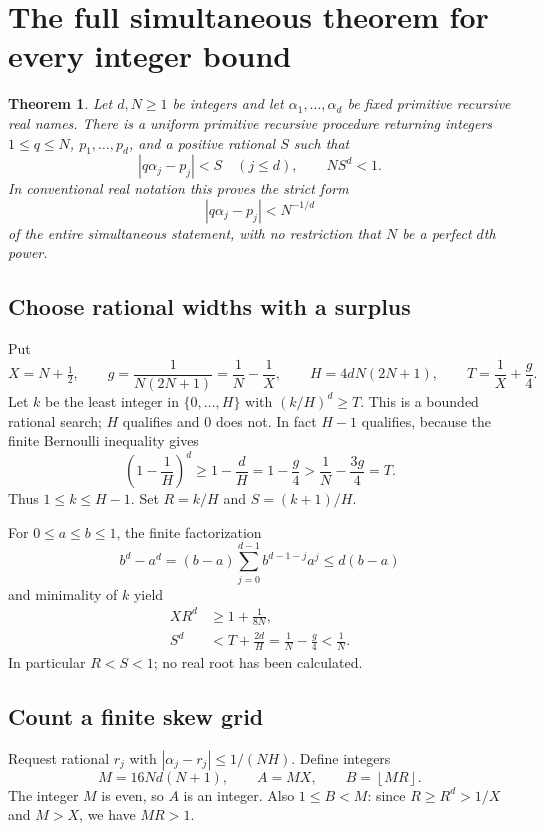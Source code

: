 \documentclass[11pt]{article}
\newtheorem{theorem}{Theorem}[section]
\theoremstyle{definition}\newtheorem{definition}[theorem]{Definition}
\theoremstyle{remark}\newtheorem{remark}[theorem]{Remark}
\newcommand{\floor}[1]{\left\lfloor#1\right\rfloor}
\begin{document}
\section{The full simultaneous theorem for every integer bound}\label{sec:simultaneous}

\begin{theorem}\label{thm:simultaneous}
Let $d,N\ge1$ be integers and let $\alpha_1,\ldots,\alpha_d$ be fixed primitive recursive real names. There is a uniform primitive recursive procedure returning integers $1\le q\le N$, $p_1,\ldots,p_d$, and a positive rational $S$ such that
\[
 |q\alpha_j-p_j|<S\quad(j\le d),\qquad NS^d<1.
\]
In conventional real notation this proves the strict form
\[
 |q\alpha_j-p_j|<N^{-1/d}
\]
of the entire simultaneous statement, with no restriction that $N$ be a perfect $d$th power.
\end{theorem}

\subsection{Choose rational widths with a surplus}

Put
\begin{equation}\label{eq:sim-constants}
 X=N+\tfrac12,\qquad
 g=\frac1{N(2N+1)}=\frac1N-\frac1X,\qquad
 H=4dN(2N+1),\qquad T=\frac1X+\frac g4.
\end{equation}
Let $k$ be the least integer in $\{0,\ldots,H\}$ with $(k/H)^d\ge T$. This is a bounded rational search; $H$ qualifies and $0$ does not. In fact $H-1$ qualifies, because the finite Bernoulli inequality gives
\[
 \left(1-\frac1H\right)^d\ge1-\frac dH=1-\frac g4
 >\frac1N-\frac{3g}4=T.
\]
Thus $1\le k\le H-1$. Set $R=k/H$ and $S=(k+1)/H$.

For $0\le a\le b\le1$, the finite factorization
\[
 b^d-a^d=(b-a)\sum_{j=0}^{d-1}b^{d-1-j}a^j\le d(b-a)
\]
and minimality of $k$ yield
\begin{align}
 XR^d&\ge1+\frac1{8N},\label{eq:sim-volume}\\
 S^d&<T+\frac{2d}H=\frac1N-\frac g4<\frac1N.\label{eq:sim-S}
\end{align}
In particular $R<S<1$; no real root has been calculated.

\subsection{Count a finite skew grid}

Request rational $r_j$ with $|\alpha_j-r_j|\le1/(NH)$. Define integers
\[
 M=16Nd(N+1),\qquad A=MX,\qquad B=\floor{MR}.
\]
The integer $M$ is even, so $A$ is an integer. Also $1\le B<M$: since $R\ge R^d>1/X$ and $M>X$, we have $MR>1$.
\end{document}
